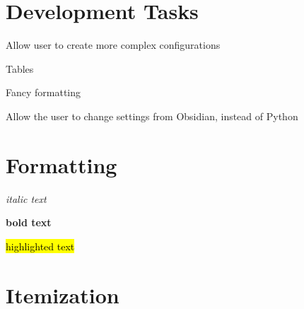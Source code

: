 \documentclass{extarticle}
\begin{document}







\section{Development Tasks}





\begin{todolist}

\item Allow user to create more complex configurations

\item Tables

\begin{todolist}

\item Fancy formatting

\end{todolist}

\item Allow the user to change settings from Obsidian, instead of Python

\end{todolist}








\section{Formatting}







\textit{italic text}



\textbf{bold text}



\hl{highlighted text}










\section{Itemization}
\end{document}
